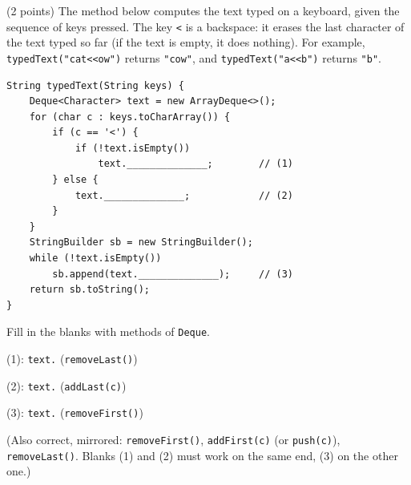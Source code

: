 \begin{question}
(2 points) The method below computes the text typed on a keyboard, given the sequence of keys pressed.
The key \lstinline|<| is a backspace: it erases the last character of the text typed so far (if the text is empty, it does nothing).
For example, \lstinline|typedText("cat<<ow")| returns \lstinline|"cow"|, and \lstinline|typedText("a<<b")| returns \lstinline|"b"|.

\begin{lstlisting}
String typedText(String keys) {
    Deque<Character> text = new ArrayDeque<>();
    for (char c : keys.toCharArray()) {
        if (c == '<') {
            if (!text.isEmpty())
                text.______________;        // (1)
        } else {
            text.______________;            // (2)
        }
    }
    StringBuilder sb = new StringBuilder();
    while (!text.isEmpty())
        sb.append(text.______________);     // (3)
    return sb.toString();
}
\end{lstlisting}

Fill in the blanks with methods of \lstinline|Deque|.

(1): \lstinline|text.|\underline{\hspace{2in}} \ifanswers (\lstinline|removeLast()|)\fi

\medskip
(2): \lstinline|text.|\underline{\hspace{2in}} \ifanswers (\lstinline|addLast(c)|)\fi

\medskip
(3): \lstinline|text.|\underline{\hspace{2in}} \ifanswers (\lstinline|removeFirst()|)\fi

\ifanswers (Also correct, mirrored: \lstinline|removeFirst()|, \lstinline|addFirst(c)| (or \lstinline|push(c)|), \lstinline|removeLast()|. Blanks (1) and (2) must work on the same end, (3) on the other one.)\fi
\end{question}

